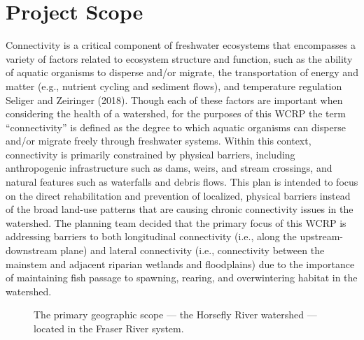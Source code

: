 \documentclass[
  letterpaper,
  DIV=11,
  numbers=noendperiod]{scrreprt}
\begin{document}
\section*{Project Scope}\label{project-scope}


Connectivity is a critical component of freshwater ecosystems that
encompasses a variety of factors related to ecosystem structure and
function, such as the ability of aquatic organisms to disperse and/or
migrate, the transportation of energy and matter (e.g., nutrient cycling
and sediment flows), and temperature regulation Seliger and Zeiringer
(2018). Though each of these factors are important when considering the
health of a watershed, for the purposes of this WCRP the term
``connectivity'' is defined as the degree to which aquatic organisms can
disperse and/or migrate freely through freshwater systems. Within this
context, connectivity is primarily constrained by physical barriers,
including anthropogenic infrastructure such as dams, weirs, and stream
crossings, and natural features such as waterfalls and debris flows.
This plan is intended to focus on the direct rehabilitation and
prevention of localized, physical barriers instead of the broad land-use
patterns that are causing chronic connectivity issues in the watershed.
The planning team decided that the primary focus of this WCRP is
addressing barriers to both longitudinal connectivity (i.e., along the
upstream-downstream plane) and lateral connectivity (i.e., connectivity
between the mainstem and adjacent riparian wetlands and floodplains) due
to the importance of maintaining fish passage to spawning, rearing, and
overwintering habitat in the watershed.

\begin{figure}


\caption{\label{fig-geoscope}The primary geographic scope --- the
Horsefly River watershed --- located in the Fraser River system.}

\end{figure}%
\end{document}
